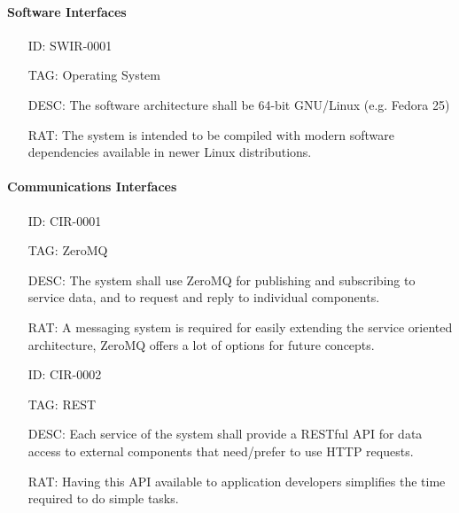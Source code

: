       \paragraph{Software Interfaces}

        \begin{itemize}
          \setlength{\itemindent}{.5in}
          \itemsep .15em
          \item[ID:] SWIR-0001
          \item[TAG:] Operating System
          \item[DESC:] The software architecture shall be 64-bit GNU/Linux
            (e.g. Fedora 25)
          \item[RAT:] The system is intended to be compiled with modern
            software dependencies available in newer Linux distributions.
        \end{itemize}

      \newpage

      \paragraph{Communications Interfaces}

        \begin{itemize}
          \setlength{\itemindent}{.5in}
          \itemsep .15em
          \item[ID:] CIR-0001
          \item[TAG:] ZeroMQ
          \item[DESC:] The system shall use ZeroMQ for publishing and
            subscribing to service data, and to request and reply to
            individual components.
          \item[RAT:] A messaging system is required for easily extending the
            service oriented architecture, ZeroMQ offers a lot of options for
            future concepts.
        \end{itemize}

        \begin{itemize}
          \setlength{\itemindent}{.5in}
          \itemsep .15em
          \item[ID:] CIR-0002
          \item[TAG:] REST
          \item[DESC:] Each service of the system shall provide a RESTful API
            for data access to external components that need/prefer to use
            HTTP requests.
          \item[RAT:] Having this API available to application developers
            simplifies the time required to do simple tasks.
        \end{itemize}

